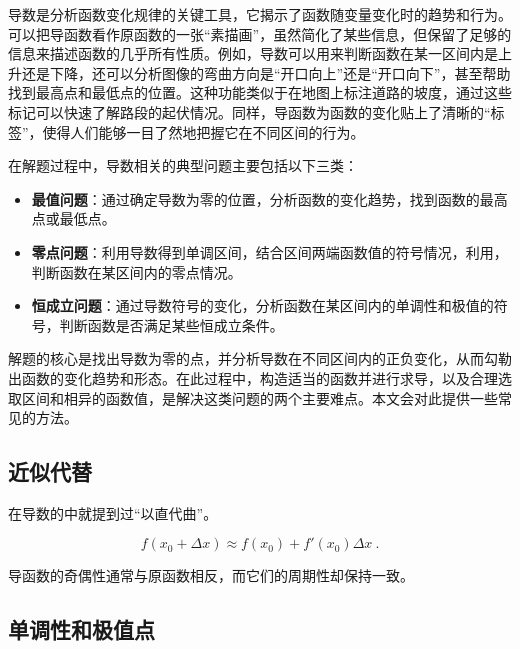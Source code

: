 
\begin{issues}
\issueDraft
\end{issues}


导数是分析函数变化规律的关键工具，它揭示了函数随变量变化时的趋势和行为。可以把导函数看作原函数的一张“素描画”，虽然简化了某些信息，但保留了足够的信息来描述函数的几乎所有性质。例如，导数可以用来判断函数在某一区间内是上升还是下降，还可以分析图像的弯曲方向是“开口向上”还是“开口向下”，甚至帮助找到最高点和最低点的位置。这种功能类似于在地图上标注道路的坡度，通过这些标记可以快速了解路段的起伏情况。同样，导函数为函数的变化贴上了清晰的“标签”，使得人们能够一目了然地把握它在不同区间的行为。

在解题过程中，导数相关的典型问题主要包括以下三类：

\begin{itemize}
\item \textbf{最值问题}：通过确定导数为零的位置，分析函数的变化趋势，找到函数的最高点或最低点。
\item \textbf{零点问题}：利用导数得到单调区间，结合区间两端函数值的符号情况，利用，判断函数在某区间内的零点情况。
\item \textbf{恒成立问题}：通过导数符号的变化，分析函数在某区间内的单调性和极值的符号，判断函数是否满足某些恒成立条件。
\end{itemize}

解题的核心是找出导数为零的点，并分析导数在不同区间内的正负变化，从而勾勒出函数的变化趋势和形态。在此过程中，构造适当的函数并进行求导，以及合理选取区间和相异的函数值，是解决这类问题的两个主要难点。本文会对此提供一些常见的方法。

\subsection{近似代替}

在导数的中就提到过“以直代曲”。

\begin{equation}
f(x_0+\Delta x)\approx f(x_0)+f'(x_0)\Delta x~.
\end{equation}

导函数的奇偶性通常与原函数相反，而它们的周期性却保持一致。

\subsection{单调性和极值点}
